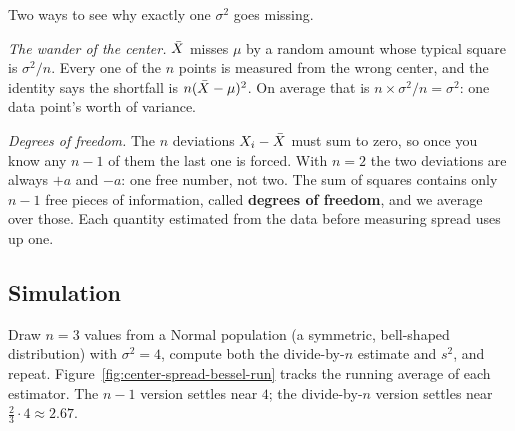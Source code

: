 \begin{whybox}
Two ways to see why exactly one $\sigma^2$ goes missing.

\emph{The wander of the center.} $\bar{X}$ misses $\mu$ by a random amount whose
typical square is $\sigma^2/n$. Every one of the $n$ points is measured from the
wrong center, and the identity says the shortfall is $n(\bar{X}-\mu)^2$. On average
that is $n\times\sigma^2/n = \sigma^2$: one data point's worth of variance.

\emph{Degrees of freedom.} The $n$ deviations $X_i - \bar{X}$ must sum to zero, so
once you know any $n-1$ of them the last one is forced. With $n=2$ the two
deviations are always $+a$ and $-a$: one free number, not two. The sum of squares
contains only $n-1$ free pieces of information, called \textbf{degrees of freedom},
and we average over those. Each quantity estimated from the data before measuring
spread uses up one.
\end{whybox}

\subsection{Simulation}

Draw $n=3$ values from a Normal population (a symmetric, bell-shaped distribution) with $\sigma^2 = 4$, compute both the
divide-by-$n$ estimate and $s^2$, and repeat. Figure~\ref{fig:center-spread-bessel-run}
tracks the running average of each estimator. The $n-1$ version settles near $4$;
the divide-by-$n$ version settles near $\tfrac{2}{3}\cdot 4 \approx 2.67$.

